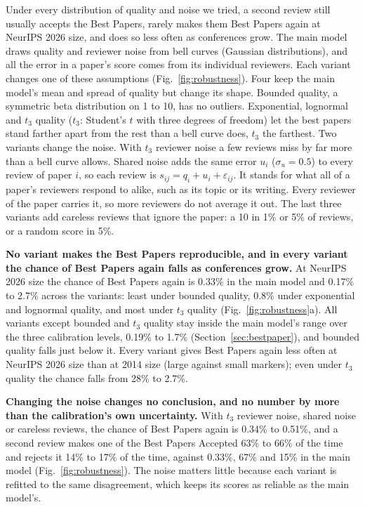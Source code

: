 \documentclass{article}
\begin{document}
Under every distribution of quality and noise we tried, a second review still usually accepts the Best Papers, rarely makes them Best Papers again at NeurIPS 2026 size, and does so less often as conferences grow. The main model draws quality and reviewer noise from bell curves (Gaussian distributions), and all the error in a paper's score comes from its individual reviewers. Each variant changes one of these assumptions (Fig.~\ref{fig:robustness}). Four keep the main model's mean and spread of quality but change its shape. Bounded quality, a symmetric beta distribution on 1 to 10, has no outliers. Exponential, lognormal and $t_3$ quality ($t_3$: Student's $t$ with three degrees of freedom) let the best papers stand farther apart from the rest than a bell curve does, $t_3$ the farthest. Two variants change the noise. With $t_3$ reviewer noise a few reviews miss by far more than a bell curve allows. Shared noise adds the same error $u_i$ ($\sigma_u=0.5$) to every review of paper $i$, so each review is $s_{ij}=q_i+u_i+\varepsilon_{ij}$. It stands for what all of a paper's reviewers respond to alike, such as its topic or its writing. Every reviewer of the paper carries it, so more reviewers do not average it out. The last three variants add careless reviews that ignore the paper: a 10 in 1\% or 5\% of reviews, or a random score in 5\%.

\textbf{No variant makes the Best Papers reproducible, and in every variant the chance of Best Papers again falls as conferences grow.} At NeurIPS 2026 size the chance of Best Papers again is 0.33\% in the main model and 0.17\% to 2.7\% across the variants: least under bounded quality, 0.8\% under exponential and lognormal quality, and most under $t_3$ quality (Fig.~\ref{fig:robustness}a). All variants except bounded and $t_3$ quality stay inside the main model's range over the three calibration levels, 0.19\% to 1.7\% (Section~\ref{sec:bestpaper}), and bounded quality falls just below it. Every variant gives Best Papers again less often at NeurIPS 2026 size than at 2014 size (large against small markers); even under $t_3$ quality the chance falls from 28\% to 2.7\%.

\textbf{Changing the noise changes no conclusion, and no number by more than the calibration's own uncertainty.} With $t_3$ reviewer noise, shared noise or careless reviews, the chance of Best Papers again is 0.34\% to 0.51\%, and a second review makes one of the Best Papers Accepted 63\% to 66\% of the time and rejects it 14\% to 17\% of the time, against 0.33\%, 67\% and 15\% in the main model (Fig.~\ref{fig:robustness}). The noise matters little because each variant is refitted to the same disagreement, which keeps its scores as reliable as the main model's.
\end{document}
